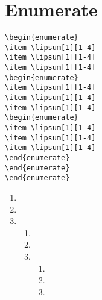 \section{Enumerate}
\begin{highlightbox}
\begin{verbatim}
\begin{enumerate}
\item \lipsum[1][1-4] 
\item \lipsum[1][1-4] 
\item \lipsum[1][1-4] 
\begin{enumerate}
\item \lipsum[1][1-4] 
\item \lipsum[1][1-4] 
\item \lipsum[1][1-4] 
\begin{enumerate}
\item \lipsum[1][1-4] 
\item \lipsum[1][1-4] 
\item \lipsum[1][1-4] 
\end{enumerate}
\end{enumerate}
\end{enumerate}
\end{verbatim}
\end{highlightbox}

\begin{enumerate}
\item \lipsum[1][1-4] 
\item \lipsum[1][1-4] 
\item \lipsum[1][1-4] 
\begin{enumerate}
\item \lipsum[1][1-4] 
\item \lipsum[1][1-4] 
\item \lipsum[1][1-4] 
\begin{enumerate}
\item \lipsum[1][1-4] 
\item \lipsum[1][1-4] 
\item \lipsum[1][1-4] 
\end{enumerate}
\end{enumerate}
\end{enumerate}

